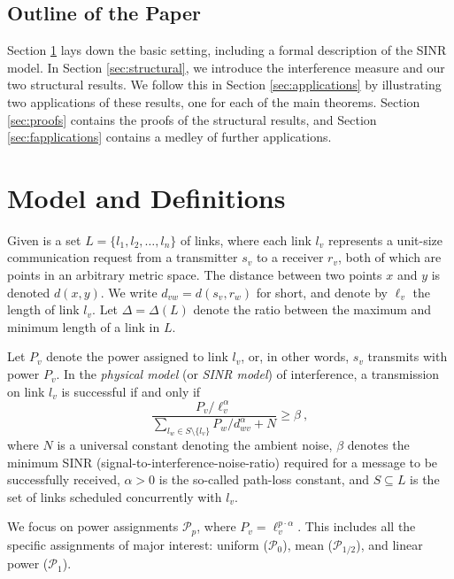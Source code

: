 \documentclass[11pt]{amsart}
\newcommand{\cal}[1]{\mathcal{#1}}
\def\calP{{\cal P}}
\def\calP{{\cal P}}   \def\calM{{\cal M}}   \def\calU{{\cal U}}   \newcommand{\PCopt}{\overline{OPT}}
\newcommand{\powp}{\calP_p}
\begin{document}
\subsection{Outline of the Paper}
Section \ref{sec:model} lays down the basic setting, including a
formal description of the SINR model. In Section \ref{sec:structural},
we introduce the interference measure and our two structural results. 
We follow this in Section \ref{sec:applications} by illustrating two
applications of these results, one for each of the main theorems.
Section \ref{sec:proofs} contains the proofs of the structural results, 
and Section \ref{sec:fapplications} contains a medley of further applications.



\section{Model and Definitions}
\label{sec:model}

Given is a set $L = \{l_1, l_2, \ldots, l_n\}$ of links, where
each link $l_v$ represents a unit-size communication request from a transmitter
$s_v$ to a receiver $r_v$, both of which are points in an arbitrary metric space.
The distance between two points $x$ and $y$ is denoted $d(x,y)$.
We write $d_{vw} = d(s_v, r_w)$ for short, and denote by $\ell_v$ the length of link $l_v$.
Let $\Delta = \Delta(L)$ denote the ratio between the maximum and
minimum length of a link in $L$.




Let $P_v$ denote the power assigned to link $l_v$, or, in other words, $s_v$ transmits with power $P_v$. In the \emph{physical model} (or \emph{SINR model}) of interference, a
transmission on link $l_v$ is successful if and only if
\begin{equation}
 \frac{P_v/\ell_v^\alpha}{\sum_{l_w \in S \setminus  \{l_v\}}
   P_w/d_{wv}^\alpha + N} \ge \beta\ , 
 \label{eq:sinr}
\end{equation}
where $N$ is a universal constant denoting the ambient noise, $\beta$ denotes the minimum
SINR (signal-to-interference-noise-ratio) required for a message to be successfully received,
$\alpha > 0$ is the so-called path-loss constant,
and $S\subseteq L$ is the set of links scheduled concurrently with $l_v$.


We focus on power assignments $\powp$, where $P_v = \ell_v^{p \cdot \alpha}$.  
This includes all the specific assignments of major interest:
uniform ($\calP_0$), mean ($\calP_{1/2}$), and linear power ($\calP_1$).
\end{document}
